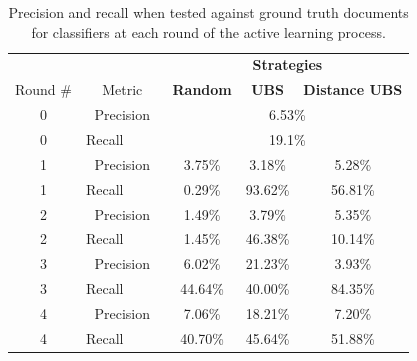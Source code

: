 \begin{table}[ht!]
\centering
\caption{Precision and recall when tested against ground truth documents for classifiers at each round of the active learning process.\label{tab:pr_table}
}
\vspace{2ex}
\setlength\tabcolsep{3pt}
\begin{tabular}{|c|c|c|c|c|}
\hline
& & \multicolumn{3}{c|}{\textbf{Strategies}} \\
 Round \# & Metric & \textbf{Random} & \textbf{UBS}  & \textbf{Distance UBS}  \\
\hline
0 & Precision &        \multicolumn{3}{c|}{6.53\%} \\
0 & Recall\ \ \ \ \ &               \multicolumn{3}{c|}{19.1\%} \\
\hline
1 & Precision     & 3.75\%       &      3.18\%      &  5.28\% \\
1 & Recall\ \ \ \ \ & 0.29\%      &   93.62\%     &  56.81\% \\
\hline
2& Precision      & 1.49\%           &      3.79\%      &  5.35\% \\
2& Recall\ \ \ \ \ & 1.45\%           &    46.38\%      &  10.14\% \\
\hline
3 & Precision      & 6.02\%              &    21.23\%      &  3.93\% \\
3 & Recall\ \ \ \ \ & 44.64\%            &    40.00\%      &  84.35\%  \\
\hline
4& Precision     & 7.06\%          &    18.21\%      &  7.20\% \\
4& Recall\ \ \ \ \ & 40.70\%         &     45.64\%     &  51.88\% \\
\hline
\end{tabular}
\end{table}


